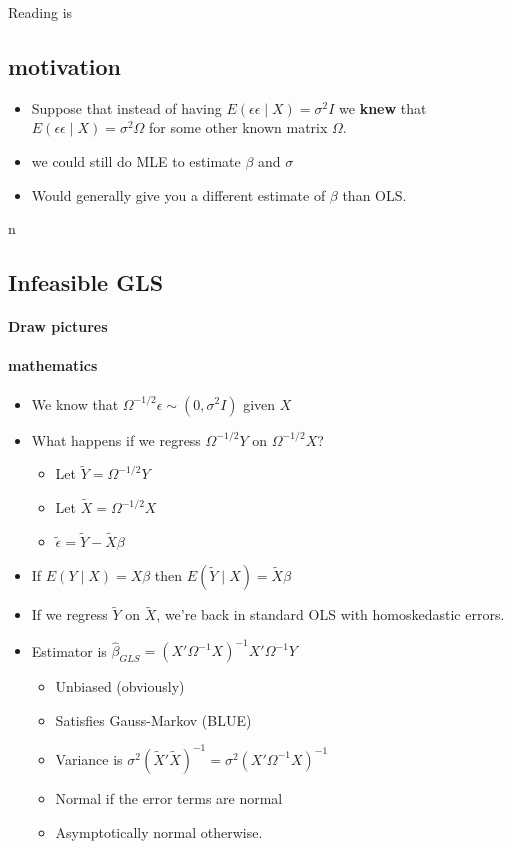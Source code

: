 Reading is \citet[8.3]{Gre_2011}

\subsection{motivation}

\begin{itemize}
\item Suppose that instead of having $E( \epsilon \epsilon \mid X) =
       \sigma^2 I$ we \textbf{knew} that $E(\epsilon \epsilon \mid X) =
       \sigma^2 \Omega$ for some other known matrix $\Omega$.
\item we could still do MLE to estimate $\beta$ and $\sigma$
\item Would generally give you a different estimate of $\beta$ than
       OLS.
\end{itemize}n

\subsection{Infeasible GLS}

\paragraph{Draw pictures}

\paragraph{mathematics}
\begin{itemize}
\item We know that $\Omega^{-1/2}\epsilon \sim (0, \sigma^2 I)$ given $X$
\item What happens if we regress $\Omega^{-1/2} Y$ on $\Omega^{-1/2} X$?
\begin{itemize}
\item Let $\tilde Y = \Omega^{-1/2} Y$
\item Let $\tilde X = \Omega^{-1/2} X$
\item $\tilde\epsilon = \tilde Y - \tilde X \beta$
\end{itemize}
\item If $E(Y \mid X) = X\beta$ then $E(\tilde Y \mid X) = \tilde X
        \beta$
\item If we regress $\tilde Y$ on $\tilde X$, we're back in standard
        OLS with homoskedastic errors.
\item Estimator is $\hat\beta_{GLS} =
        (X'\Omega^{-1}X)^{-1}X'\Omega^{-1}Y$
\begin{itemize}
\item Unbiased (obviously)
\item Satisfies Gauss-Markov (BLUE)
\item Variance is $\sigma^2 (\tilde X' \tilde X)^{-1} = \sigma^2
          (X' \Omega^{-1} X)^{-1}$
\item Normal if the error terms are normal
\item Asymptotically normal otherwise.
\end{itemize}
\end{itemize}

